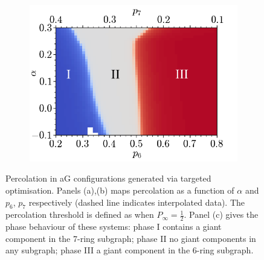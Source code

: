 \begin{figure}[bt]
      \begin{subfigure}[b]{0.5\textwidth}
         \centering
         \includegraphics[width=\textwidth]{./figures/targeted_opt/perc3.pdf}
         \caption{}
         \label{fig:percres3}
     \end{subfigure}
     \hfill
     
     \caption{Percolation in aG configurations generated via targeted optimisation. Panels (a),(b) maps percolation as a function of $\alpha$ and $p_6$, $p_7$ respectively (dashed line indicates interpolated data). The percolation threshold is defined as when $P_\infty=\frac{1}{2}$. Panel (c) gives the phase behaviour of these systems: phase I contains a giant component in the 7\--ring subgraph; phase II no giant components in any subgraph; phase III a giant component in the 6\--ring subgraph.}
     \label{fig:percolationres}
\end{figure}

